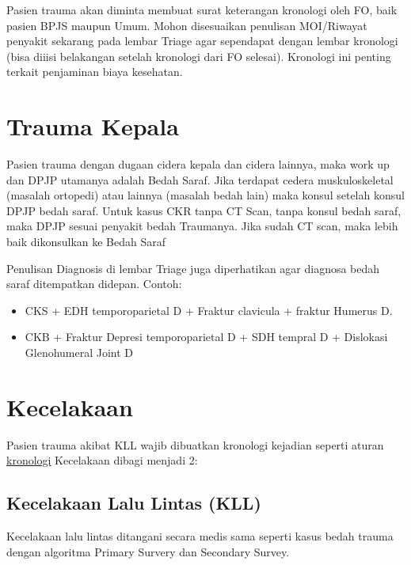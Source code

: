 \documentclass[
]{book}
\providecommand{\tightlist}{%
  \setlength{\itemsep}{0pt}\setlength{\parskip}{0pt}}
\begin{document}
Pasien trauma akan diminta membuat surat keterangan kronologi oleh FO, baik pasien BPJS maupun Umum.
Mohon disesuaikan penulisan MOI/Riwayat penyakit sekarang pada lembar Triage agar sependapat dengan lembar kronologi (bisa diiisi belakangan setelah kronologi dari FO selesai).
Kronologi ini penting terkait penjaminan biaya kesehatan.

\hypertarget{trauma-kepala}{%
\section{Trauma Kepala}\label{trauma-kepala}}

Pasien trauma dengan dugaan cidera kepala dan cidera lainnya, maka work up dan DPJP utamanya adalah Bedah Saraf. Jika terdapat cedera muskuloskeletal (masalah ortopedi) atau lainnya (masalah bedah lain) maka konsul setelah konsul DPJP bedah saraf. Untuk kasus CKR tanpa CT Scan, tanpa konsul bedah saraf, maka DPJP sesuai penyakit bedah Traumanya. Jika sudah CT scan, maka lebih baik dikonsulkan ke Bedah Saraf

Penulisan Diagnosis di lembar Triage juga diperhatikan agar diagnosa bedah saraf ditempatkan didepan. Contoh:

\begin{itemize}
\tightlist
\item
  CKS + EDH temporoparietal D + Fraktur clavicula + fraktur Humerus D.
\item
  CKB + Fraktur Depresi temporoparietal D + SDH tempral D + Dislokasi Glenohumeral Joint D
\end{itemize}

\hypertarget{kecelakaan}{%
\section{Kecelakaan}\label{kecelakaan}}

Pasien trauma akibat KLL wajib dibuatkan kronologi kejadian seperti aturan \protect\hyperlink{kronologi}{kronologi}
Kecelakaan dibagi menjadi 2:

\hypertarget{kecelakaan-lalu-lintas-kll}{%
\subsection{Kecelakaan Lalu Lintas (KLL)}\label{kecelakaan-lalu-lintas-kll}}

Kecelakaan lalu lintas ditangani secara medis sama seperti kasus bedah trauma dengan algoritma Primary Survery dan Secondary Survey.
\end{document}
